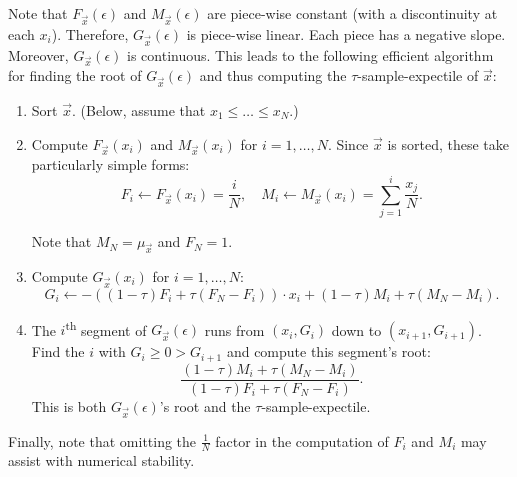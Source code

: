 \documentclass{article}
\begin{document}
Note that $F_{\vec x}(\epsilon)$ and $M_{\vec x}(\epsilon)$ are piece-wise constant (with a discontinuity at each $x_i$).
Therefore, $G_{\vec x}(\epsilon)$ is piece-wise linear.
Each piece has a negative slope.
Moreover, $G_{\vec x}(\epsilon)$ is continuous\footnotemark.
This leads to the following efficient algorithm for finding the root of $G_{\vec x}(\epsilon)$ and thus computing the $\tau$-sample-expectile of $\vec x$:
\begin{enumerate}
\item 
    Sort $\vec x$. (Below, assume that $x_1 \leq \ldots \leq x_N$.)
\item
    Compute $F_{\vec x}(x_i)$ and $M_{\vec x}(x_i)$ for $i = 1, \ldots, N$.
    Since $\vec x$ is sorted, these take particularly simple forms:
    $$
    F_i \gets F_{\vec x}(x_i) = \frac{i}{N},
    \quad
    M_i \gets M_{\vec x}(x_i) = \sum_{j=1}^{i}\frac{x_j}{N}.
    $$
    
    Note that $M_N = \mu_{\vec x}$ and $F_N = 1$.
\item
    Compute $G_{\vec x}(x_i)$ for $i = 1, \ldots, N$:
    $$
    G_i
    \gets
    -((1-\tau) F_i + \tau(F_N - F_i)) \cdot x_i
    + (1-\tau) M_i + \tau(M_N - M_i).
    $$
\item
    The $i$\textsuperscript{th} segment of $G_{\vec x}(\epsilon)$
    runs from $(x_i, G_i)$ down to $(x_{i+1}, G_{i+1})$.
    Find the $i$ with
    $G_i \geq 0 > G_{i+1}$
    and compute this segment's root:
    $$
    \frac
        {(1-\tau) M_i + \tau(M_N - M_i)}
        {(1-\tau) F_i + \tau(F_N - F_i)}
    .
    $$
    This is both $G_{\vec x}(\epsilon)$'s root and the $\tau$-sample-expectile.
\end{enumerate}
Finally, note that omitting the $\frac{1}{N}$ factor in the computation of $F_i$ and $M_i$ may assist with numerical stability.



  

\end{document}
